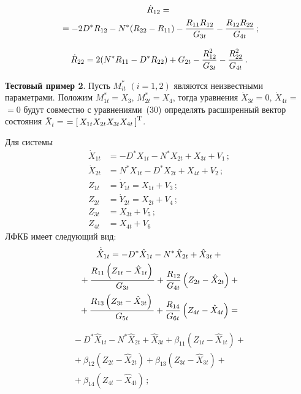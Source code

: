 \begin{multicols}{2}
    \vspace*{-12pt}
    
    \noindent
    \begin{multline*}
    \dot R_{12} ={}\\
    {}=- 2D^* R_{12} - N^*(R_{22}- R_{11})  -
    \displaystyle\frac{\displaystyle R_{11} R_{12}\mathstrut}{\displaystyle  G_{3t}\mathstrut}  - \displaystyle\frac{\displaystyle R_{12} R_{22}\mathstrut}{\displaystyle G_{4t}\mathstrut}\,;
    \end{multline*}
    
    \vspace*{-12pt}
    
    \noindent
    \begin{equation*}
    \dot R_{22} = 2(N^* R_{11} -D^* R_{22}) + G_{2t} -
 \displaystyle\frac{\displaystyle R_{12}^2\mathstrut}{\displaystyle G_{3t}\mathstrut} - \displaystyle\frac{\displaystyle R_{22}^2\mathstrut}{\displaystyle G_{4t}\mathstrut}\,.
 \end{equation*}

\noindent
\textbf{Тестовый пример 2}.
Пусть $M_{it}^*$ $(i=1,2)$ являются неизвестными параметрами. 
Положим $M_{1t}^* = X_3$, $M_{2t}^* = X_4$, тогда уравнения  
$\dot X_{3t} =0$, $\dot X_{4t}=$\linebreak $=0$ будут совместно с уравнениями~(30) 
определять расширенный вектор состояния $\bar X_t= $\linebreak $=\left[\, X_{1t} X_{2t} X_{3t} X_{4t}\,\right]^{\mathrm{T}}$.

Для системы
\begin{align*}
    \dot X_{1t} &=  - D^* X_{1t} - N^* X_{2t} +X_{3t}+V_1\,;\\
    \dot X_{2t} &=  N^* X_{1t} - D^* X_{2t} +X_{4t}+V_2\,;\\
Z_{1t}&=\dot Y_{1t} = X_{1t} + V_3\,;\\
Z_{2t} &=\dot Y_{2t} = X_{2t} +V_4\,;\\ 
Z_{3t} &= X_{3t}+V_5\,;\\
 Z_{4t} &= X_{4t} +V_6
 \end{align*}
ЛФКБ имеет следующий вид:
\begin{multline*}
\dot{\hat X}_{1t} = - D^* \hat X_{1t} - N^*\hat X_{2t} +\hat X_{3t}+{}\\
{}+ \displaystyle\frac{\displaystyle R_{11} \left(Z_{1t} -\hat X_{1t}\right)\mathstrut}{\displaystyle G_{3t}\mathstrut}+ \displaystyle\frac{\displaystyle R_{12}\mathstrut}{\displaystyle G_{4t}\mathstrut} \left(Z_{2t} -\hat X_{2t}\right)+{}\\
{}+ \displaystyle\frac{\displaystyle R_{13}\left(Z_{3t} -\hat X_{3t}\right)\mathstrut}{\displaystyle G_{5t}\mathstrut}+\displaystyle\frac{\displaystyle R_{14}\mathstrut}{\displaystyle G_{6t}\mathstrut} \left(Z_{4t} -\hat X_{4t}\right)={}
\end{multline*}


\noindent
\begin{multline*}
{}- D^* \hat X_{1t} - N^*\hat X_{2t} +\hat X_{3t}+ \beta_{11} \left(Z_{1t} -\hat X_{1t}\right)+ {}\\
{}+\beta_{12} (Z_{2t} -\hat X_{2t})+\beta_{13}
    \left(Z_{3t} -\hat X_{3t}\right)+{}\\
    {}+\beta_{14} \left(Z_{4t} -\hat X_{4t}\right)\,;
    \end{multline*}
    

\end{multicols}
